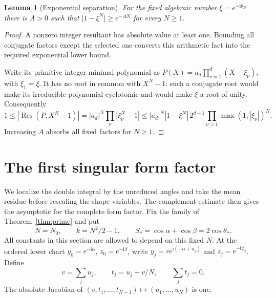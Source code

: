 \documentclass[11pt]{article}
\numberwithin{equation}{section}
\newtheorem{lemma}[theorem]{Lemma}
\theoremstyle{definition}
\newcommand{\ii}{\mathrm i}
\newcommand{\Res}{\operatorname{Res}}
\begin{document}
\begin{lemma}[Exponential separation]\label{lem:resultant}
For the fixed algebraic number \(\xi=e^{-\ii\theta_B}\) there is
\(A>0\) such that \(\lvert1-\xi^N\rvert\ge e^{-AN}\) for every \(N\ge1\).
\end{lemma}
\begin{proof}
A nonzero integer resultant has absolute value at least one. Bounding all conjugate factors except the selected one converts this arithmetic fact into the required exponential lower bound.

Write its primitive integer minimal polynomial as
\(P(X)=a_d\prod_{\nu=1}^d(X-\xi_\nu)\), with \(\xi_1=\xi\).
It has no root in common with \(X^N-1\): such a conjugate root would make
its irreducible polynomial cyclotomic and would make \(\xi\) a root of
unity. Consequently
\[
 1\le |\Res(P,X^N-1)|
 =|a_d|^N\prod_\nu|\xi_\nu^N-1|
 \le |a_d|^N|1-\xi^N|\,2^{d-1}
       \prod_{\nu>1}\max(1,|\xi_\nu|)^N.
\]
Increasing \(A\) absorbs all fixed factors for \(N\ge1\).
\end{proof}



\section{The first singular form factor}
\label{sec:first}

We localize the double integral by the unreduced angles and take the
mean residue before rescaling the shape variables. The complement
estimate then gives the asymptotic for the complete form factor.
Fix the family of Theorem~\ref{thm:prime} and put
\[
 N=N_0,\qquad k=N^2/2-1,\qquad
 S_*=\cos\alpha+\cos\beta=2\cos\theta_*.
\]
All constants in this section are allowed to depend on this fixed \(N\).
At the ordered lower chart \(y_0=e^{-\ii\alpha}\),
\(z_0=e^{-\ii\beta}\), write \(y_j=r e^{\ii(-\alpha+u_j)}\) and
\(z_j=e^{-\ii\phi_j}\). Define
\[
 v=\sum_j u_j,\qquad t_j=u_j-v/N,\qquad \sum_jt_j=0.
\]
The absolute Jacobian of \((v,t_1,\ldots,t_{N-1})\mapsto(u_1,\ldots,u_N)\)
is one.
\end{document}
